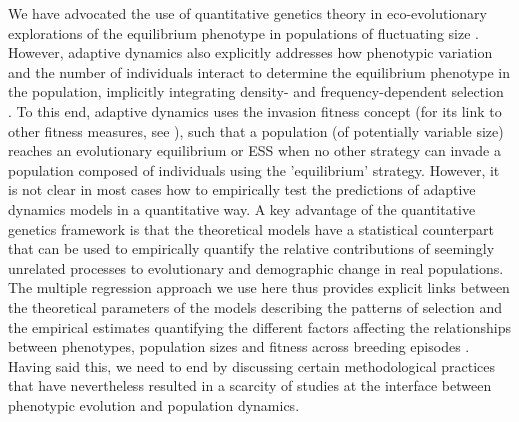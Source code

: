 \documentclass{article}
\begin{document}
We have advocated the use of quantitative genetics theory in eco-evolutionary explorations of the equilibrium phenotype in populations of fluctuating size \citep{Engen2013, Engen2020, Lande2017, Lande2009a}. However, adaptive dynamics also explicitly addresses how phenotypic variation and the number of individuals interact to determine the equilibrium phenotype in the population, implicitly integrating density- and frequency-dependent selection \citep{McGill2007}. To this end, adaptive dynamics uses the invasion fitness concept (for its link to other fitness measures, see \cite{Lehmann2016}), such that a population (of potentially variable size) reaches an evolutionary equilibrium or ESS when no other strategy can invade a population composed of individuals using the 'equilibrium' strategy. However, it is not clear in most cases how to empirically test the predictions of adaptive dynamics models in a quantitative way. A key advantage of the quantitative genetics framework is that the theoretical models have a statistical counterpart that can be used to empirically quantify the relative contributions of seemingly unrelated processes to evolutionary and demographic change in real populations. The multiple regression approach we use here thus provides explicit links between the theoretical parameters of the models describing the patterns of selection and the empirical estimates quantifying the different factors affecting the relationships between phenotypes, population sizes and fitness across breeding episodes \citep{Lande1983, Queller1992, Wolf1999SocialSelection, Heisler1987, Goodnight1992}. Having said this, we need to end by discussing certain methodological practices that have nevertheless resulted in a scarcity of studies at the interface between phenotypic evolution and population dynamics.
\end{document}
